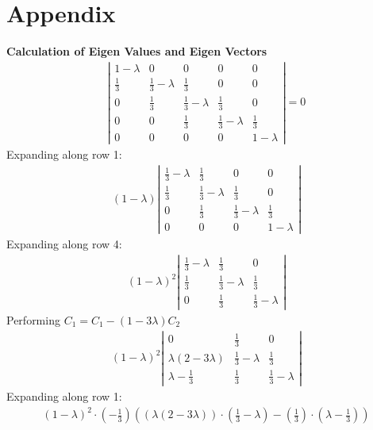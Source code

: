 \documentclass[journal,12pt,twocolumn]{IEEEtran}
\begin{document}
\section{Appendix}
\textbf{Calculation of Eigen Values and Eigen Vectors}
\begin{align}
    \left|\begin{array}{ccccc}1 - \lambda & 0 & 0 & 0 & 0\\\frac{1}{3} & \frac{1}{3} - \lambda & \frac{1}{3} & 0 & 0\\0 & \frac{1}{3} & \frac{1}{3} - \lambda & \frac{1}{3} & 0\\0 & 0 & \frac{1}{3} & \frac{1}{3} - \lambda & \frac{1}{3}\\0 & 0 & 0 & 0 & 1 - \lambda\end{array}\right| = 0
\end{align}
Expanding along row 1:
\begin{align}
(1-\lambda)
 \left|\begin{array}{cccc}\frac{1}{3} - \lambda & \frac{1}{3} & 0 & 0\\\frac{1}{3} & \frac{1}{3} - \lambda & \frac{1}{3} & 0\\0 & \frac{1}{3} & \frac{1}{3} - \lambda & \frac{1}{3}\\0 & 0 & 0 & 1 - \lambda\end{array}\right|
\end{align}
Expanding along row 4:
\begin{align}
(1-\lambda)^2
 \left|\begin{array}{ccc}\frac{1}{3} - \lambda & \frac{1}{3} & 0 \\\frac{1}{3} & \frac{1}{3} - \lambda & \frac{1}{3} \\0 & \frac{1}{3} & \frac{1}{3} - \lambda \end{array}\right| 
\end{align}
Performing $C_{1} = C_{1} - \left(1 - 3 \lambda\right) C_{2}$
\begin{align}
(1-\lambda)^2
 \left|\begin{array}{ccc}0 & \frac{1}{3} & 0\\\lambda \left(2 - 3 \lambda\right) & \frac{1}{3} - \lambda & \frac{1}{3}\\\lambda - \frac{1}{3} & \frac{1}{3} & \frac{1}{3} - \lambda\end{array}\right|
\end{align}
Expanding along row 1:
\begin{align}
(1-\lambda)^2\cdot \left(-\frac{1}{3}\right) 
\left(\left(\lambda \left(2 - 3 \lambda\right)\right)\cdot \left(\frac{1}{3} - \lambda\right) - \left(\frac{1}{3}\right)\cdot \left(\lambda - \frac{1}{3}\right)\right)
\end{align}
\end{document}
